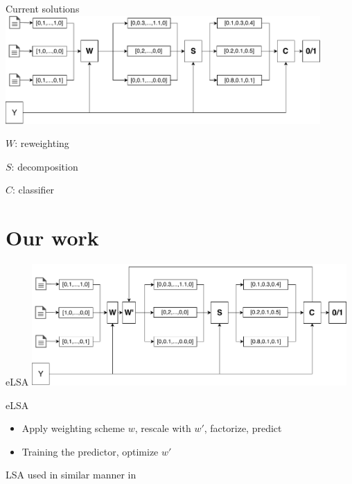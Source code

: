 \documentclass[xcolor={table}]{beamer}
\begin{document}
\begin{frame}{Current solutions}
    \includegraphics[width=0.9\textwidth]{LSA+supervision.pdf}
    \begin{block}
        
        $W$: reweighting

        $S$: decomposition
        
        $C$: classifier
    \end{block}
\end{frame}

\section{Our work}
\begin{frame}{eLSA}
    \includegraphics[width=0.9\textwidth]{eLSA.pdf}

    \begin{block}{eLSA}
        \begin{itemize}
            \item Apply weighting scheme $w$, rescale with $w'$, factorize, predict 
            \item Training the predictor, optimize $w'$
        \end{itemize}
    \end{block}
    
    LSA used in similar manner in \cite{ionescu2015training}
\end{frame} 
\end{document}
